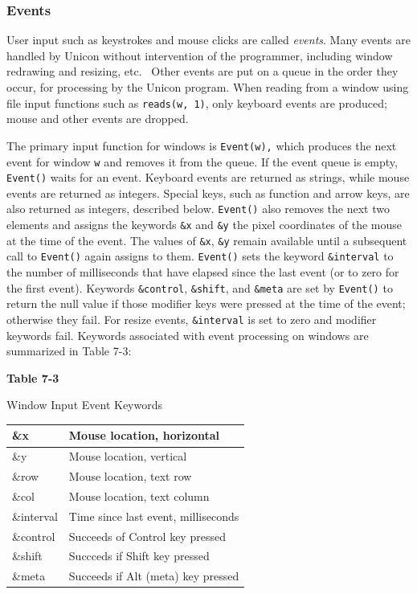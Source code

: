 \subsubsection{Events}

User input such as keystrokes and mouse clicks are called
\textit{events}. Many events are handled by Unicon without intervention
of the programmer, including window redrawing and resizing, etc.
\ Other events are put on a queue in the order they occur, for
processing by the Unicon program. When reading from a window using file
input functions such as \texttt{reads(w, 1)}, only keyboard events are
produced; mouse and other events are dropped.

The primary input function for windows is \texttt{Event(w),} which
produces the next event for window \texttt{w} and removes it from the
queue. If the event queue is empty, \texttt{Event()} waits for an
event. Keyboard events are returned as strings, while mouse events are
returned as integers. Special keys, such as function and arrow keys,
are also returned as integers, described below. \texttt{Event()} also
removes the next two elements and assigns the keywords \texttt{\&x} and
\texttt{\&y} the pixel coordinates of the mouse at the time of the
event. The values of \texttt{\&x}, \texttt{\&y} remain available until
a subsequent call to \texttt{Event()} again assigns to them.
\texttt{Event()} sets the keyword \texttt{\&interval} to the number of
milliseconds that have elapsed since the last event (or to zero for the
first event). Keywords \texttt{\&control}, \texttt{\&shift}, and
\texttt{\&meta} are set by \texttt{Event()} to return the null value if
those modifier keys were pressed at the time of the event; otherwise
they fail. For resize events, \texttt{\&interval} is set to zero and
modifier keywords fail. Keywords associated with event processing on
windows are summarized in Table 7-3:

{\centering\sffamily\bfseries
Table 7-3

Window Input Event Keywords
}

\begin{center}
\begin{supertabular}{|m{0.91775984in}|m{2.3525598in}|}
\sffamily \&x &
Mouse location, horizontal\\\hline
\sffamily \&y &
Mouse location, vertical\\\hline
\sffamily \&row &
Mouse location, text row\\\hline
\sffamily \&col &
Mouse location, text column\\\hline
\sffamily \&interval &
Time since last event, milliseconds\\\hline
\sffamily \&control &
Succeeds of Control key pressed\\\hline
\sffamily \&shift &
Succceds if Shift key pressed\\\hline
\sffamily \&meta &
Succeeds if Alt (meta) key pressed\\\hline
\end{supertabular}
\end{center}
